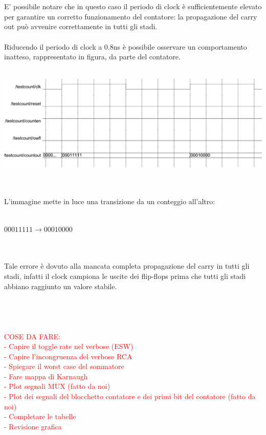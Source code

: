 \documentclass[10pt,  english, makeidx, a4paper, titlepage, oneside]{book}
\begin{document}
\\\\
E' possibile notare che in questo caso il periodo di clock è 
sufficientemente elevato per garantire un corretto funzionamento 
del contatore: la propagazione del carry out può avvenire correttamente
in tutti gli stadi.
\\\\
Riducendo il periodo di clock a 0.8ns è possibile osservare un
comportamento inatteso, rappresentato in figura, da parte del contatore.
\\\\
\centerline{\includegraphics[width=15cm]{./img/Lab_1/Es_5/Clk_corto.png}}
\\\\
L'immagine mette in luce una transizione da un conteggio all'altro:
\\\\
\centerline{$00011111 \rightarrow 00010000$}
\\\\
Tale errore è dovuto alla mancata completa propagazione del carry in tutti
gli stadi, infatti il clock campiona le uscite dei flip-flops prima che tutti
gli stadi abbiano raggiunto un valore stabile. 
\\\\\\\\\\
\textcolor{red}{COSE DA FARE: \\
                - Capire il toggle rate nel verbose (ESW) \\
                - Capire l'incongruenza del verbose RCA \\
                - Spiegare il worst case del sommatore \\
                - Fare mappa di Karnaugh \\
                - Plot segnali MUX (fatto da noi) \\
                - Plot dei segnali del blocchetto contatore e dei primi bit del contatore (fatto da noi)\\
                - Completare le tabelle \\
                - Revisione grafica}    
                
\end{document}
